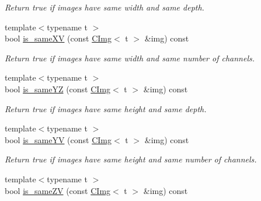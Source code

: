 \begin{DoxyCompactItemize}
\begin{DoxyCompactList}\small\item\em Return {\ttfamily true} if images have same width and same depth. \end{DoxyCompactList}\item 
\hypertarget{structcimg__library_1_1_c_img_a688d65953f8b1d9eee84e154735fb67e}{{\footnotesize template$<$typename t $>$ }\\bool \hyperlink{structcimg__library_1_1_c_img_a688d65953f8b1d9eee84e154735fb67e}{is\-\_\-same\-X\-V} (const \hyperlink{structcimg__library_1_1_c_img}{C\-Img}$<$ t $>$ \&img) const }\label{structcimg__library_1_1_c_img_a688d65953f8b1d9eee84e154735fb67e}

\begin{DoxyCompactList}\small\item\em Return {\ttfamily true} if images have same width and same number of channels. \end{DoxyCompactList}\item 
\hypertarget{structcimg__library_1_1_c_img_a1b4add24e6780c12eb5ba43dc6cfc8ef}{{\footnotesize template$<$typename t $>$ }\\bool \hyperlink{structcimg__library_1_1_c_img_a1b4add24e6780c12eb5ba43dc6cfc8ef}{is\-\_\-same\-Y\-Z} (const \hyperlink{structcimg__library_1_1_c_img}{C\-Img}$<$ t $>$ \&img) const }\label{structcimg__library_1_1_c_img_a1b4add24e6780c12eb5ba43dc6cfc8ef}

\begin{DoxyCompactList}\small\item\em Return {\ttfamily true} if images have same height and same depth. \end{DoxyCompactList}\item 
\hypertarget{structcimg__library_1_1_c_img_a855f3838dd43f923104dd17f31b1b143}{{\footnotesize template$<$typename t $>$ }\\bool \hyperlink{structcimg__library_1_1_c_img_a855f3838dd43f923104dd17f31b1b143}{is\-\_\-same\-Y\-V} (const \hyperlink{structcimg__library_1_1_c_img}{C\-Img}$<$ t $>$ \&img) const }\label{structcimg__library_1_1_c_img_a855f3838dd43f923104dd17f31b1b143}

\begin{DoxyCompactList}\small\item\em Return {\ttfamily true} if images have same height and same number of channels. \end{DoxyCompactList}\item 
\hypertarget{structcimg__library_1_1_c_img_a924330b2502f4753b283ecb1282179d2}{{\footnotesize template$<$typename t $>$ }\\bool \hyperlink{structcimg__library_1_1_c_img_a924330b2502f4753b283ecb1282179d2}{is\-\_\-same\-Z\-V} (const \hyperlink{structcimg__library_1_1_c_img}{C\-Img}$<$ t $>$ \&img) const }\label{structcimg__library_1_1_c_img_a924330b2502f4753b283ecb1282179d2}


\end{DoxyCompactItemize}
